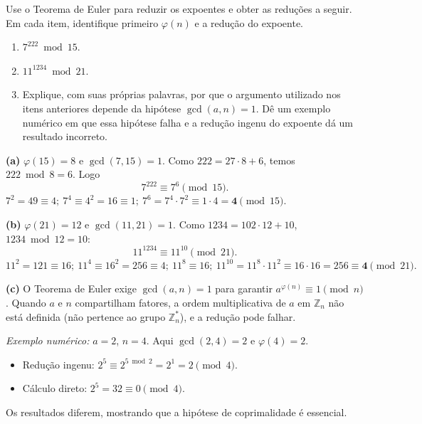 \documentclass[12pt,a4paper]{article}
\begin{document}
\begin{exercicio}
Use o Teorema de Euler para reduzir os expoentes e obter as redu\c{c}\~{o}es a seguir. Em cada item, identifique primeiro $\varphi(n)$ e a redu\c{c}\~{a}o do expoente.
\begin{enumerate}[label=(\alph*)]
    \item $7^{222} \bmod 15$.
    \item $11^{1234} \bmod 21$.
    \item Explique, com suas pr\'{o}prias palavras, por que o argumento utilizado nos itens anteriores depende da hip\'{o}tese $\gcd(a, n) = 1$. D\^{e} um exemplo num\'{e}rico em que essa hip\'{o}tese falha e a redu\c{c}\~{a}o ingenu do expoente d\'{a} um resultado incorreto.
\end{enumerate}

\begin{resposta}
\textbf{(a)} $\varphi(15) = 8$ e $\gcd(7,15)=1$. Como $222 = 27 \cdot 8 + 6$, temos $222 \bmod 8 = 6$. Logo
\[
7^{222} \equiv 7^{6} \pmod{15}.
\]
$7^2 = 49 \equiv 4;\ 7^4 \equiv 4^2 = 16 \equiv 1;\ 7^6 = 7^4 \cdot 7^2 \equiv 1 \cdot 4 = \mathbf{4} \pmod{15}.$

\textbf{(b)} $\varphi(21) = 12$ e $\gcd(11,21)=1$. Como $1234 = 102 \cdot 12 + 10$, $1234 \bmod 12 = 10$:
\[
11^{1234} \equiv 11^{10} \pmod{21}.
\]
$11^2 = 121 \equiv 16;\ 11^4 \equiv 16^2 = 256 \equiv 4;\ 11^8 \equiv 16;\ 11^{10} = 11^8 \cdot 11^2 \equiv 16 \cdot 16 = 256 \equiv \mathbf{4} \pmod{21}.$

\textbf{(c)} O Teorema de Euler exige $\gcd(a,n) = 1$ para garantir $a^{\varphi(n)} \equiv 1 \pmod{n}$. Quando $a$ e $n$ compartilham fatores, a ordem multiplicativa de $a$ em $\mathbb{Z}_n$ n\~{a}o est\'{a} definida (n\~{a}o pertence ao grupo $\mathbb{Z}_n^{*}$), e a redu\c{c}\~{a}o pode falhar.

\emph{Exemplo num\'{e}rico:} $a = 2$, $n = 4$. Aqui $\gcd(2,4)=2$ e $\varphi(4) = 2$.
\begin{itemize}[leftmargin=1.4em,topsep=2pt,itemsep=1pt]
    \item Redu\c{c}\~{a}o ingenu: $2^{5} \equiv 2^{5 \bmod 2} = 2^{1} = 2 \pmod{4}$.
    \item C\'{a}lculo direto: $2^{5} = 32 \equiv 0 \pmod{4}$.
\end{itemize}
Os resultados diferem, mostrando que a hip\'{o}tese de coprimalidade \'{e} essencial.
\end{resposta}
\end{exercicio}
\end{document}
